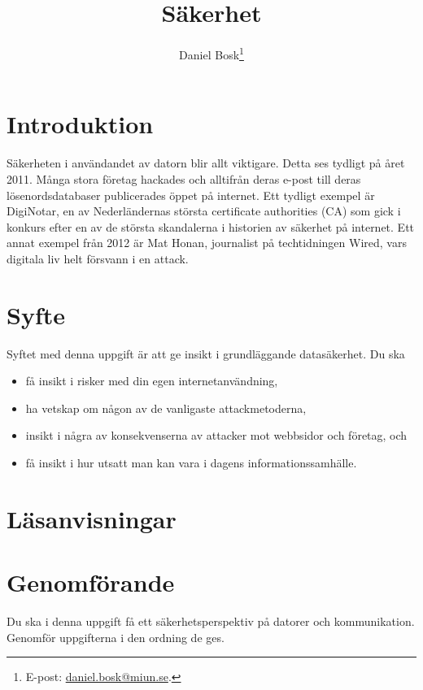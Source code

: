 \documentclass[a4paper]{miunasgn}
\title{Säkerhet}
\author{Daniel Bosk\footnote{%
	E-post: \href{mailto:daniel.bosk@miun.se}{daniel.bosk@miun.se}.
}}
\date{\svnId}
\begin{document}
\maketitle
\thispagestyle{foot}
\tableofcontents


\section{Introduktion}
\label{sec:Introduktion}
\noindent
Säkerheten i användandet av datorn blir allt viktigare.
Detta ses tydligt på året 2011.
Många stora företag hackades och alltifrån deras e-post till deras 
lösenordsdatabaser publicerades öppet på internet.
Ett tydligt exempel är DigiNotar, en av Nederländernas största certificate 
authorities (CA) som gick i konkurs efter en av de största skandalerna 
i historien av säkerhet på internet.
Ett annat exempel från 2012 är Mat Honan, journalist på techtidningen Wired, 
vars digitala liv helt försvann i en attack.


\section{Syfte}
\label{sec:Syfte}
\noindent
Syftet med denna uppgift är att ge insikt i grundläggande datasäkerhet.
Du ska
\begin{itemize}
	\item få insikt i risker med din egen internetanvändning,
	\item ha vetskap om någon av de vanligaste attackmetoderna,
	\item insikt i några av konsekvenserna av attacker mot webbsidor och
		företag, och
	\item få insikt i hur utsatt man kan vara i dagens informationssamhälle.
\end{itemize}


\section{Läsanvisningar}
\label{sec:Lasanvisningar}
\noindent



\section{Genomförande}
\label{sec:Genomforande}
\noindent
Du ska i denna uppgift få ett säkerhetsperspektiv på datorer och kommunikation.
Genomför uppgifterna i den ordning de ges.
\end{document}
